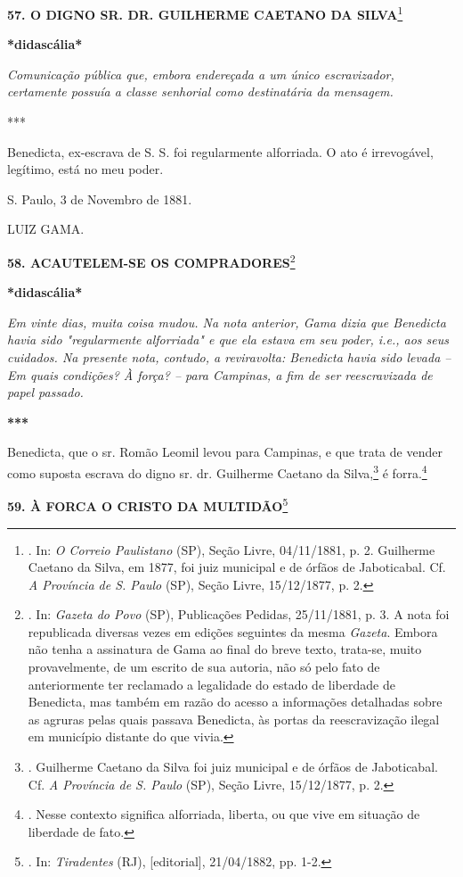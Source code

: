 \textbf{57. O DIGNO SR. DR. GUILHERME CAETANO DA SILVA}\footnote{. In:
  \emph{O Correio Paulistano} (SP), Seção Livre, 04/11/1881, p. 2.
  Guilherme Caetano da Silva, em 1877, foi juiz municipal e de órfãos de
  Jaboticabal. Cf. \emph{A Província de S. Paulo} (SP), Seção Livre,
  15/12/1877, p. 2.}

\textbf{*}\textbf{didascália*}

\emph{Comunicação pública que, embora endereçada a um único
escravizador, certamente possuía a classe senhorial como destinatária da
mensagem.}

***

Benedicta, ex-escrava de S. S. foi regularmente alforriada. O ato é
irrevogável, legítimo, está no meu poder.

S. Paulo, 3 de Novembro de 1881.

LUIZ GAMA.

\textbf{58. ACAUTELEM-SE OS
COMPRADORES}\footnote{. In: \emph{Gazeta do Povo} (SP), Publicações
  Pedidas, 25/11/1881, p. 3. A nota foi republicada diversas vezes em
  edições seguintes da mesma \emph{Gazeta}. Embora não tenha a
  assinatura de Gama ao final do breve texto, trata-se, muito
  provavelmente, de um escrito de sua autoria, não só pelo fato de
  anteriormente ter reclamado a legalidade do estado de liberdade de
  Benedicta, mas também em razão do acesso a informações detalhadas
  sobre as agruras pelas quais passava Benedicta, às portas da
  reescravização ilegal em município distante do que vivia.}

\textbf{*didascália*}

\emph{Em vinte dias, muita coisa mudou. Na nota anterior, Gama dizia que
Benedicta havia sido "regularmente alforriada" e que ela estava em seu
poder, i.e., aos seus cuidados. Na presente nota, contudo, a
reviravolta: Benedicta havia sido levada -- Em quais condições? À força?
-- para Campinas, a fim de ser reescravizada de papel passado.}

\textbf{***}

Benedicta, que o sr. Romão Leomil levou para Campinas, e que trata de
vender como suposta escrava do digno sr. dr. Guilherme Caetano da
Silva,\footnote{. Guilherme Caetano da Silva foi juiz municipal e de
  órfãos de Jaboticabal. Cf. \emph{A Província de S. Paulo} (SP), Seção
  Livre, 15/12/1877, p. 2.} é forra.\footnote{. Nesse contexto significa
  alforriada, liberta, ou que vive em situação de liberdade de fato.}

\textbf{59. À FORCA O CRISTO DA MULTIDÃO}\footnote{. In:
  \emph{Tiradentes} (RJ), {[}editorial{]}, 21/04/1882, pp. 1-2.}

